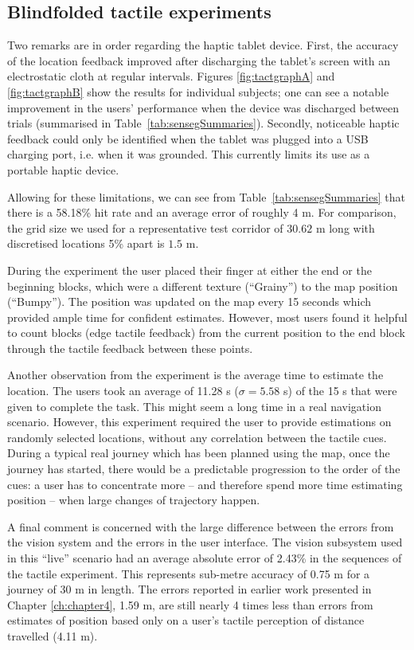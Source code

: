 \subsection{Blindfolded tactile experiments}


Two remarks are in order regarding the haptic tablet device. First, the accuracy of the location feedback improved after discharging the tablet's screen with an electrostatic cloth at regular intervals. Figures \ref{fig:tactgraphA} and \ref{fig:tactgraphB} show the results for individual subjects; one can see a notable improvement in the users' performance when the device was discharged between trials (summarised in Table~\ref{tab:sensegSummaries}). Secondly, noticeable haptic feedback could only be identified when the tablet was plugged into a USB charging port, i.e. when it was grounded. This currently limits its use as a portable haptic device.
  
Allowing for these limitations, we can see from Table~\ref{tab:sensegSummaries} that there is a 58.18\% hit rate and an average error of roughly 4 m. For comparison, the grid size we used for a representative test corridor of $30.62$ m long with discretised locations 5\% apart is $1.5$ m. 

During the experiment the user placed their finger at either the end or the beginning blocks, which were a different texture (``Grainy'') to the map position (``Bumpy''). The position was updated on the map every 15 seconds which provided ample time for confident estimates. However, most users found it helpful to count blocks (edge tactile feedback) from the current position to the end block through the tactile feedback between these points.

Another observation from the experiment is the average time to estimate the location. The users took an average of 11.28 s ($\sigma = 5.58$ s) of the 15 s that were given to complete the task. This might seem a long time in a real navigation scenario. However, this experiment required the user to provide estimations on randomly selected locations, without any correlation between the tactile cues. During a typical real journey which has been planned using the map, once the journey has started, there would be a predictable progression to the order of the cues: a user has to concentrate more -- and therefore spend more time estimating position -- when large changes of trajectory happen.

A final comment is concerned with the large difference between the errors from the vision system and the errors in the user interface. The vision subsystem used in this ``live'' scenario had an average absolute error of 2.43\% in the sequences of the tactile experiment. This represents sub-metre accuracy of 0.75 m for a journey of 30 m in length. The errors reported in earlier work presented in Chapter \ref{ch:chapter4}, 1.59 m, are still nearly 4 times less than errors from estimates of position based only on a user's tactile perception of distance travelled (4.11 m).

